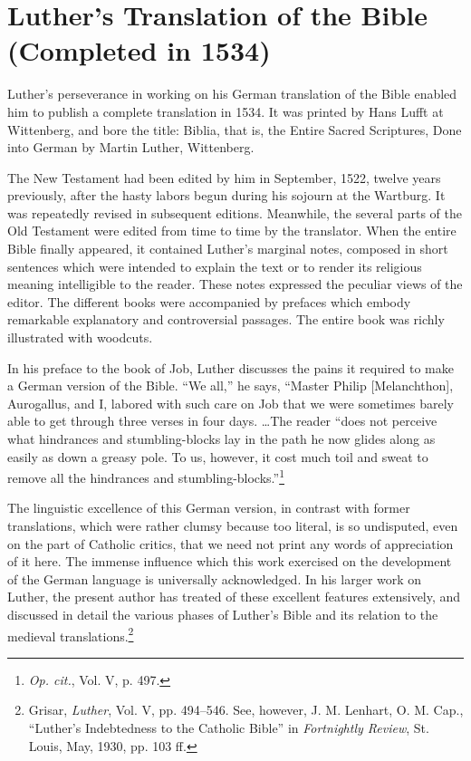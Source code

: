 \section{Luther’s Translation of the Bible (Completed in 1534)}

Luther’s perseverance in working on his German translation of
the Bible enabled him to publish a complete translation in 1534. It
was printed by Hans Lufft at Wittenberg, and bore the title: Biblia,
that is, the Entire Sacred Scriptures, Done into German by Martin
Luther, Wittenberg.

The New Testament had been edited by him in September, 1522,
twelve years previously, after the hasty labors begun during his
sojourn at the Wartburg. It was repeatedly revised in subsequent
editions. Meanwhile, the several parts of the Old Testament were
edited from time to time by the translator. When the entire Bible
finally appeared, it contained Luther’s marginal notes, composed in
short sentences which were intended to explain the text or to render
its religious meaning intelligible to the reader. These notes expressed
the peculiar views of the editor. The different books were accompanied
by prefaces which embody remarkable explanatory and controversial
passages. The entire book was richly illustrated with woodcuts.

In his preface to the book of Job, Luther discusses the pains it
required to make a German version of the Bible. “We all,” he says,
“Master Philip [Melanchthon], Aurogallus, and I, labored with such
care on Job that we were sometimes barely able to get through three
verses in four days. \dots The reader “does not perceive what hindrances
and stumbling-blocks lay in the path he now glides along as
easily as down a greasy pole. To us, however, it cost much toil and
sweat to remove all the hindrances and stumbling-blocks.”\footnote
{\textit{Op. cit.}, Vol. V, p. 497.}

The linguistic excellence of this German version, in contrast with
former translations, which were rather clumsy because too literal, is
so undisputed, even on the part of Catholic critics, that we need not
print any words of appreciation of it here. The immense influence
which this work exercised on the development of the German language is
universally acknowledged. In his larger work on Luther, the
present author has treated of these excellent features extensively, and
discussed in detail the various phases of Luther’s Bible and its relation
to the medieval translations.\footnote
{Grisar, \textit{Luther}, Vol. V, pp. 494--546. See, however, J. M. Lenhart, O. M. Cap.,
``Luther’s Indebtedness to the Catholic Bible'' in \textit{Fortnightly Review}, St. Louis, May, 1930,
pp. 103 ff.}

